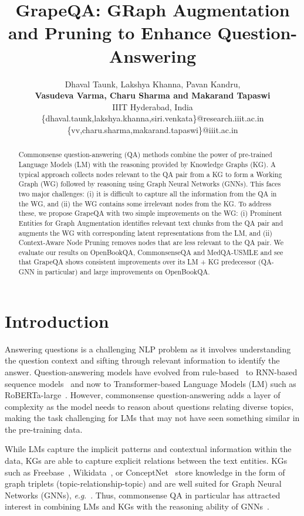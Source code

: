 \documentclass[11pt]{article}
\title{GrapeQA: GRaph Augmentation and Pruning to Enhance Question-Answering}
\author{Dhaval Taunk, Lakshya Khanna, Pavan Kandru,\\ {\bf Vasudeva Varma, Charu Sharma and Makarand Tapaswi} \\
IIIT Hyderabad, India\\ \{dhaval.taunk,lakshya.khanna,siri.venkata\}@research.iiit.ac.in\\ \{vv,charu.sharma,makarand.tapaswi\}@iiit.ac.in}
\newcommand{\eg}{\textit{e}.\textit{g}.}
\newcommand{\roberta}{RoBERTa-large}
\newcommand{\methodname}{GrapeQA}
\begin{document}
\maketitle
\begin{abstract}
Commonsense question-answering (QA) methods combine the power of pre-trained Language Models (LM) with the reasoning provided by Knowledge Graphs (KG).
A typical approach collects nodes relevant to the QA pair from a KG to form a Working Graph (WG) followed by reasoning using Graph Neural Networks (GNNs).
This faces two major challenges:
(i) it is difficult to capture all the information from the QA in the WG, and
(ii) the WG contains some irrelevant nodes from the KG.
To address these, we propose \methodname{} with two simple improvements on the WG:
(i) Prominent Entities for Graph Augmentation
identifies relevant text chunks from the QA pair and augments the WG with corresponding latent representations from the LM, and
(ii) Context-Aware Node Pruning
removes nodes that are less relevant to the QA pair.
We evaluate our results on OpenBookQA, CommonsenseQA and MedQA-USMLE and see that \methodname{} shows consistent improvements over its LM + KG predecessor (QA-GNN in particular) and large improvements on OpenBookQA.
\end{abstract}

\section{Introduction}
\def\thefootnote{*}
\def\thefootnote{\arabic{footnote}}





Answering questions is a challenging NLP problem as it involves understanding the question context and sifting through relevant information to identify the answer.
Question-answering models have evolved from rule-based~\cite{7980526} to RNN-based sequence models~\cite{https://doi.org/10.48550/arxiv.1703.05851} and now to Transformer-based Language Models (LM) such as \roberta~\cite{DBLP:journals/corr/abs-1907-11692}.
However, commonsense question-answering
adds a layer of complexity as the model needs to reason about questions relating diverse topics, making the task challenging for LMs that may not have seen something similar in the pre-training data.

While LMs capture the implicit patterns and contextual information within the data, KGs are able to capture explicit relations between the text entities.
KGs such as
Freebase~\cite{bollacker2008freebase},
Wikidata~\cite{vrandevcic2012wikidata}, or
ConceptNet~\cite{speer2017conceptnet} store knowledge in the form of graph triplets (topic-relationship-topic) and are well suited for Graph Neural Networks (GNNs), \eg ~\cite{welling2016semi}.
Thus, commonsense QA in particular has attracted interest in combining LMs and KGs with the reasoning ability of GNNs~\cite{lin-etal-2019-kagnet,yasunaga-etal-2021-qa}.
\end{document}
